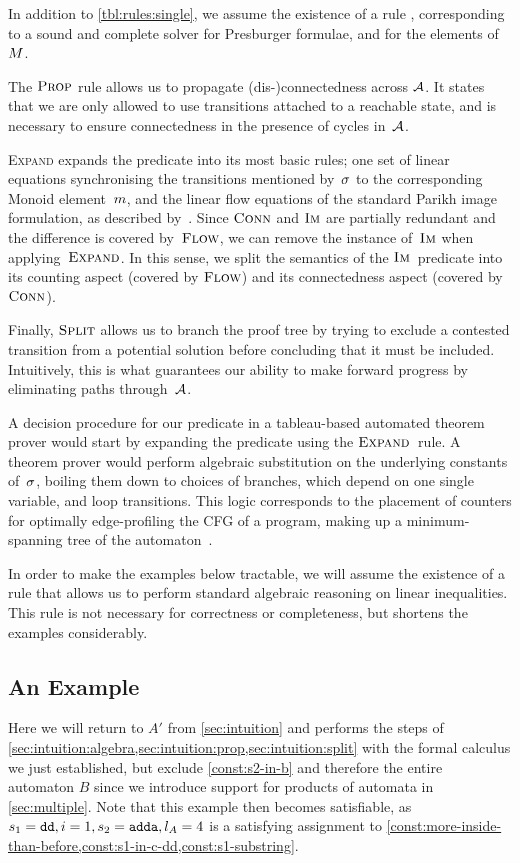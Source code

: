 In addition to \cref{tbl:rules:single}, we assume the existence of a rule
\PresburgerClose{}, corresponding to a sound and complete solver for Presburger
formulae, and for the elements of~$M$.

The $\textsc{Prop}{}$ rule allows us to propagate (dis-)connectedness across
$\mathcal{A}$. It states that we are only allowed to use transitions attached to
a reachable state, and is necessary to ensure connectedness in the presence of
cycles in~$\mathcal{A}$.

\textsc{Expand} expands the predicate into its most basic rules; one set of
linear equations synchronising the transitions mentioned by~$\operatorname{\sigma}$ to the
corresponding Monoid element~$m$, and the linear flow equations of
the standard Parikh image formulation, as described by~\FlowEq. Since
$\operatorname{\textsc{Conn}}$ and $\operatorname{\textsc{Im}}$ are partially redundant and the difference is covered
by~$\textsc{Flow}$, we can remove the instance of~$\operatorname{\textsc{Im}}$ when applying~$\textsc{Expand}$. In
this sense, we split the semantics of the $\operatorname{\textsc{Im}}$~predicate into its counting
aspect (covered by $\textsc{Flow}$) and its connectedness aspect (covered by
$\operatorname{\textsc{Conn}}$).

Finally, $\textsc{Split}{}$ allows us to branch the proof tree by trying to exclude a
contested transition from a potential solution before concluding that it must be
included. Intuitively, this is what guarantees our ability to make forward
progress by eliminating paths through~$\mathcal{A}$.

A decision procedure for our predicate in a tableau-based automated theorem
prover would start by expanding the predicate using the $\textsc{Expand}{}$~rule. A
theorem prover would perform algebraic substitution on the underlying constants
of~$\operatorname{\sigma}$, boiling them down to choices of branches, which depend on one
single variable, and loop transitions. This logic corresponds to the placement
of counters for optimally edge-profiling the CFG of a program, making up a
minimum-spanning tree of the automaton~\cite{path-profiling}.

In order to make the examples below tractable, we will assume the existence of a
rule \EquationReasoning{} that allows us to perform standard algebraic reasoning
on linear inequalities. This rule is not necessary for correctness or
completeness, but shortens the examples considerably.

\subsection{An Example}
Here we will return to $A'$ from \cref{sec:intuition} and performs the steps of
\cref{sec:intuition:algebra,sec:intuition:prop,sec:intuition:split} with the
formal calculus we just established, but exclude \cref{const:s2-in-b} and
therefore the entire automaton $B$ since we introduce support for products of
automata in \cref{sec:multiple}. Note that this example then becomes
satisfiable, as $s_1 = \texttt{dd}, i = 1, s_2 = \texttt{adda}, l_A = 4$ is a
satisfying assignment to
\cref{const:more-inside-than-before,const:s1-in-c-dd,const:s1-substring}.


